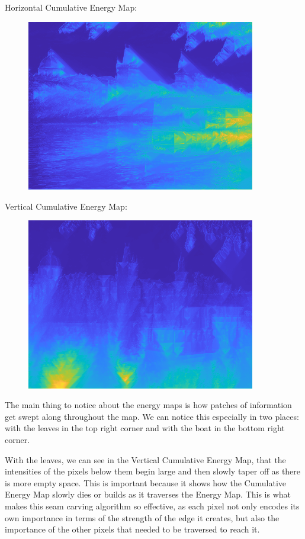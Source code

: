 \documentclass[12pt]{article}
\begin{document}
\noindent
Horizontal Cumulative Energy Map:
\begin{figure}[H]
  \includegraphics[width=100mm]{PS1_Q3_2.png}
\end{figure}

\noindent
Vertical Cumulative Energy Map:
\begin{figure}[H]
  \includegraphics[width=100mm]{PS1_Q3_3.png}
\end{figure}

\noindent
The main thing to notice about the energy maps is how patches of information get swept along throughout the map. We can notice this especially in two places: with the leaves in the top right corner and with the boat in the bottom right corner. 

\noindent
With the leaves, we can see in the Vertical Cumulative Energy Map, that the intensities of the pixels below them begin large and then slowly taper off as there is more empty space. This is important because it shows how the Cumulative Energy Map slowly dies or builds as it traverses the Energy Map. This is what makes this seam carving algorithm so effective, as each pixel not only encodes its own importance in terms of the strength of the edge it creates, but also the importance of the other pixels that needed to be traversed to reach it.
\end{document}
